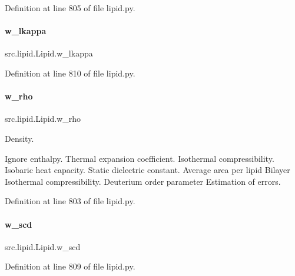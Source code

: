 Definition at line 805 of file lipid.\+py.

\mbox{\label{classsrc_1_1lipid_1_1Lipid_a3888d275433d526c0840e3af9db0fddf}} 
\paragraph{\texorpdfstring{w\+\_\+lkappa}{w\_lkappa}}
{\footnotesize\ttfamily src.\+lipid.\+Lipid.\+w\+\_\+lkappa}



Definition at line 810 of file lipid.\+py.

\mbox{\label{classsrc_1_1lipid_1_1Lipid_a60d969be860474902ccbd8b68e4434bc}} 
\paragraph{\texorpdfstring{w\+\_\+rho}{w\_rho}}
{\footnotesize\ttfamily src.\+lipid.\+Lipid.\+w\+\_\+rho}



Density. 

Ignore enthalpy. Thermal expansion coefficient. Isothermal compressibility. Isobaric heat capacity. Static dielectric constant. Average area per lipid Bilayer Isothermal compressibility. Deuterium order parameter Estimation of errors. 

Definition at line 803 of file lipid.\+py.

\mbox{\label{classsrc_1_1lipid_1_1Lipid_a68af5aa1f97716955bf72ba233b56811}} 
\paragraph{\texorpdfstring{w\+\_\+scd}{w\_scd}}
{\footnotesize\ttfamily src.\+lipid.\+Lipid.\+w\+\_\+scd}



Definition at line 809 of file lipid.\+py.

